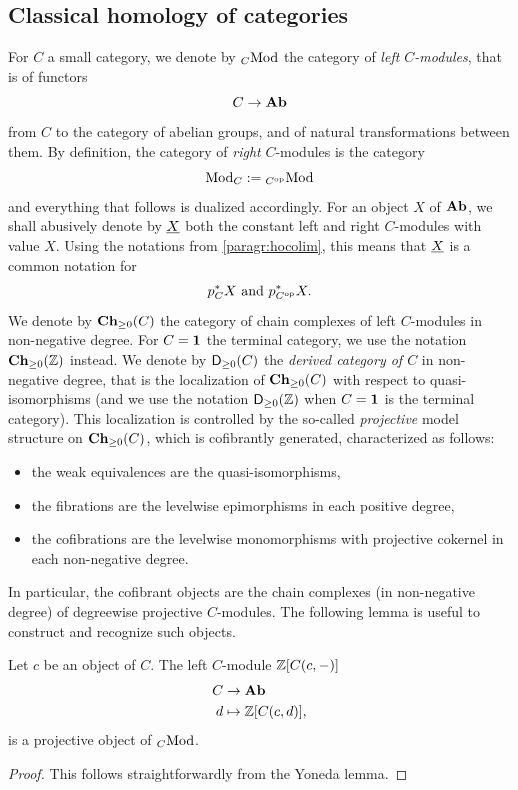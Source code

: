 \subsection{Classical homology of categories}
\begin{paragr}\label{paragr:homalg}
  For $C$ a small category, we denote by ${}_{C}\mathrm{Mod}$ the category of
  \emph{left $C$\nbd-modules}, that is of functors
  \[
    C \to \mathbf{Ab}
  \]
  from $C$ to the category of abelian groups, and of natural
  transformations between them. By definition, the category of \emph{right}
  $C$\nbd-modules is the category
  \[
    \mathrm{Mod}_{C}:={}_{C^{{\mathrm{op}}}}\mathrm{Mod}
  \]
  and everything that follows is dualized accordingly. For an object
  $X$ of $\mathbf{Ab}$, we shall abusively denote by $\underline{X}$ both the constant left
  and right $C$\nbd-modules with value $X$. Using the notations from
  \ref{paragr:hocolim}, this means that $\underline{X}$ is a common notation for
  \[
   p_C^*X \text{ and } p_{C^{\mathrm{op}}}^*X.
  \]
  We denote by $\mathbf{Ch}_{\geq 0}(C)$ the category of chain complexes
  of left $C$\nbd-modules in non-negative degree. For $C=\mathbf{1}$ the
  terminal category, we use the notation $\mathbf{Ch}_{\geq 0}(\mathbb Z)$ instead. 
  We denote by $\mathsf{D}_{\geq 0}(C)$ the \emph{derived
 category of $C$} in non-negative degree, that is the
localization of $\mathbf{Ch}_{\geq 0}(C)$ with respect to
 quasi-isomorphisms (and we use the notation $\mathsf{D}_{\geq 0}(\mathbb Z)$ when
 $C=\mathbf{1}$ is the terminal category). This localization is controlled by the
  so-called \emph{projective} model structure on $\mathbf{Ch}_{\geq 0}(C)$, which is
  cofibrantly generated,
  characterized as follows:
  \begin{itemize}
  \item the weak equivalences are the quasi-isomorphisms,
  \item the fibrations are the levelwise epimorphisms in each positive
    degree,
  \item the cofibrations are the levelwise monomorphisms with
    projective cokernel in each non-negative degree.
  \end{itemize}
  In particular, the cofibrant objects are the chain complexes (in
  non-negative degree) of degreewise projective
  $C$\nbd-modules. The following lemma is useful to
  construct and recognize such objects.
\end{paragr}
\begin{lemma}\label{lemma:freeisproj}
  Let $c$ be an object of $C$. The left $C$\nbd-module $\mathbb Z[C(c,-)]$
  \[
    \begin{aligned}
      C &\to \mathbf{Ab}\\
      d &\mapsto \mathbb Z[C(c,d)],
    \end{aligned}
  \]
  is a projective object of ${}_{C}\mathrm{Mod}$.
\end{lemma}
\begin{proof}
  This follows straightforwardly from the Yoneda lemma.
\end{proof}

